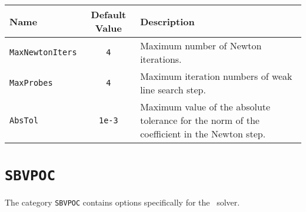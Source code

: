 \begin{tabularx}{\linewidth}{|l|c|X|}\hline
\textbf{Name} & \textbf{Default Value} & \textbf{Description}\\\hline
\lstinline+MaxNewtonIters+ & \lstinline+4+ & Maximum number of Newton iterations.\\ 
\lstinline+MaxProbes+ & \lstinline+4+ & Maximum iteration numbers of weak line search step.\\ 
\lstinline+AbsTol+ & \lstinline+1e-3+ & Maximum value of the absolute tolerance for the norm of the coefficient in the Newton step. \\ 
\hline
\end{tabularx}

\section{\texorpdfstring{\lstinline+SBVPOC+}{SBVPOC}}
\label{sec:options_opts_sbvpoc}

The category \lstinline+SBVPOC+ contains options specifically for the \BVP\ solver.

